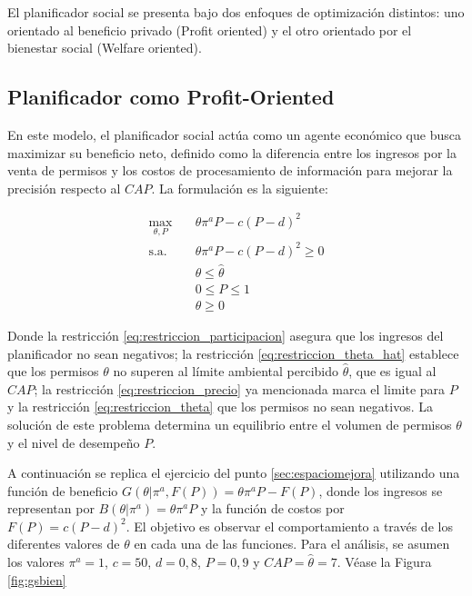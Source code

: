 El planificador social se presenta bajo dos enfoques de optimización distintos: uno orientado al beneficio privado (Profit oriented) y el otro orientado por el bienestar  social (Welfare oriented).

\subsection{Planificador como Profit-Oriented}

En este modelo, el planificador social actúa como un agente económico que busca maximizar su beneficio neto, definido como la diferencia entre los ingresos por la venta de permisos y los costos de procesamiento de información para mejorar la precisión respecto al $CAP$. La formulación es la siguiente:

\begin{align}
\max_{\theta, P} \quad & \theta \pi^{a} P - c(P-d)^{2} \label{eq:modelo_profit_obj} \\
\text{s.a.} \quad 
& \theta \pi^{a} P - c(P-d)^{2} \geq 0 \label{eq:restriccion_participacion} \\
& \theta \leq \hat{\theta} \label{eq:restriccion_theta_hat} \\
& 0 \leq P \leq 1 \label{eq:restriccion_precio} \\
& \theta \geq 0 \label{eq:restriccion_theta}
\end{align}

Donde la restricción \ref{eq:restriccion_participacion} asegura que los ingresos del planificador no sean negativos; la restricción \ref{eq:restriccion_theta_hat} establece que los permisos $\theta$ no superen al límite ambiental percibido $\hat{\theta}$, que es igual al $CAP$; la restricción \ref{eq:restriccion_precio} ya mencionada marca el limite para $P$ y la restricción \ref{eq:restriccion_theta} que los permisos no sean negativos. La solución de este problema determina un equilibrio entre el volumen de permisos $\theta$ y el nivel de desempeño $P$.

A continuación se replica el ejercicio del punto \ref{sec:espaciomejora} utilizando una función de beneficio $G(\theta|\pi^a,F(P))= \theta \pi^aP - F(P)$, donde los ingresos se representan por $B(\theta|\pi^a)=\theta \pi^aP$ y la función de costos por $F(P)= c(P - d)^2$. El objetivo es observar el comportamiento a través de los diferentes valores de $\theta$ en cada una de las funciones. Para el análisis, se asumen los valores $\pi^a = 1$, $c = 50$, $d = 0,8$, $P=0,9$ y $CAP=\hat\theta=7$. Véase la Figura \ref{fig:gsbien}

